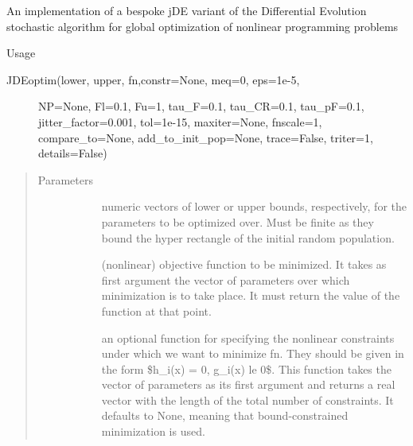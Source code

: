 \documentclass[letterpaper,10pt,english]{sphinxmanual}
\begin{document}
\begin{fulllineitems}
\label{\detokenize{_modules/nlrob:nlrob.utils.JDEoptim}}
An implementation of a bespoke jDE variant of the Differential Evolution
stochastic algorithm for global optimization of nonlinear programming
problems

Usage
\begin{description}
\item[{JDEoptim(lower, upper, fn,constr=None, meq=0, eps=1e-5,}] \leavevmode
NP=None, Fl=0.1, Fu=1, tau\_F=0.1, tau\_CR=0.1,
tau\_pF=0.1, jitter\_factor=0.001, tol=1e-15,
maxiter=None, fnscale=1, compare\_to=None,
add\_to\_init\_pop=None, trace=False, triter=1,
details=False)

\end{description}
\begin{quote}\begin{description}
\item[{Parameters}] \leavevmode\begin{description}
\item[{}] \leavevmode
numeric vectors of lower or upper bounds, respectively, for the
parameters to be optimized over. Must be finite as they bound the hyper
rectangle of the initial random population.

\item[{}] \leavevmode
(nonlinear) objective function to be minimized. It takes as first
argument the vector of parameters over which minimization is to take
place. It must return the value of the function at that point.

\item[{}] \leavevmode
an optional function for specifying the nonlinear constraints under
which we want to minimize fn. They should be given in the form
\$h\_i(x) = 0, g\_i(x) le 0\$. This function takes the vector of parameters
as its first argument and returns a real vector with the length of the
total number of constraints. It defaults to None, meaning that
bound-constrained minimization is used.


\end{description}
\end{description}
\end{quote}
\end{fulllineitems}
\end{document}

